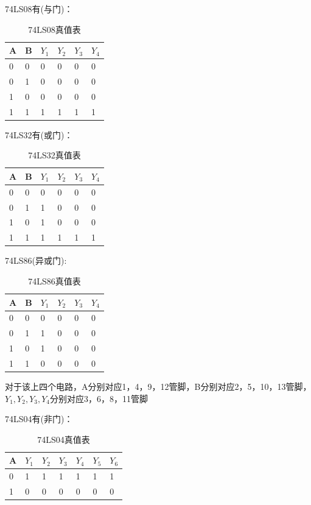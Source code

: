 \documentclass{ctexart}
\begin{document}
    74LS08有(与门)：
    \begin{table}[!ht]
    \centering
    \caption{74LS08真值表}
    \begin{tabular}{|l|l|l|l|l|l|}
    \hline
        A & B & $Y_1$ & $Y_2$ & $Y_3$ & $Y_4$  \\ \hline
        0 & 0 & 0 & 0 & 0 & 0 \\ \hline
        0 & 1 & 0 & 0 & 0 & 0 \\ \hline
        1 & 0 & 0 & 0 & 0 & 0 \\ \hline
        1 & 1 & 1 & 1 & 1 & 1 \\ \hline
    \end{tabular}
    \end{table}
    
    74LS32有(或门)：
    \begin{table}[!ht]
    \centering
    \caption{74LS32真值表}
    \begin{tabular}{|l|l|l|l|l|l|}
    \hline
        A & B & $Y_1$ & $Y_2$ & $Y_3$ & $Y_4$  \\ \hline
        0 & 0 & 0 & 0 & 0 & 0 \\ \hline
        0 & 1 & 1 & 0 & 0 & 0 \\ \hline
        1 & 0 & 1 & 0 & 0 & 0 \\ \hline
        1 & 1 & 1 & 1 & 1 & 1 \\ \hline
    \end{tabular}
    \end{table}
    
    74LS86(异或门):
    \begin{table}[!ht]
    \centering
    \caption{74LS86真值表}
    \begin{tabular}{|l|l|l|l|l|l|}
    \hline
        A & B & $Y_1$ & $Y_2$ & $Y_3$ & $Y_4$   \\ \hline
        0 & 0 & 0 & 0 & 0 & 0 \\ \hline
        0 & 1 & 1 & 0 & 0 & 0 \\ \hline
        1 & 0 & 1 & 0 & 0 & 0 \\ \hline
        1 & 1 & 0 & 0 & 0 & 0 \\ \hline
    \end{tabular}
    \end{table}
    
    对于该上四个电路，A分别对应1，4，9，12管脚，B分别对应2，5，10，13管脚，$Y_1 ,Y_2 , Y_3 , Y_4$分别对应3，6，8，11管脚

    74LS04有(非门)：
    \begin{table}[!ht]
    \centering
    \caption{74LS04真值表}
    \begin{tabular}{|l|l|l|l|l|l|l|}
    \hline
        A & $Y_1$ & $Y_2$ & $Y_3$ & $Y_4$  & $Y_5$ & $Y_6$  \\ \hline
        0 & 1 & 1 & 1 & 1 & 1 & 1 \\ \hline
        1 & 0 & 0 & 0 & 0 & 0 & 0 \\ \hline
    \end{tabular}
    \end{table}
\end{document}
